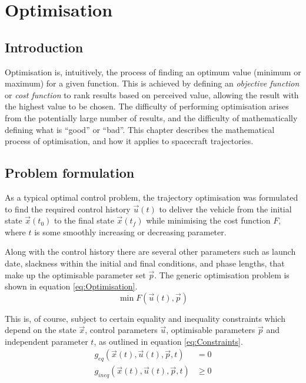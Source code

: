 \chapter{Optimisation} \label{cha:Optimisation}
\section{Introduction} \label{sec:Optimisation-Introduction}

Optimisation is, intuitively, the process of finding an optimum value (minimum or maximum) for a given function. This is achieved by defining an \emph{objective function} or \emph{cost function} to rank results based on perceived value, allowing the result with the highest value to be chosen. The difficulty of performing optimisation arises from the potentially large number of results, and the difficulty of mathematically defining what is \enquote{good} or \enquote{bad}. This chapter describes the mathematical process of optimisation, and how it applies to spacecraft trajectories.

\section{Problem formulation} \label{sec:Formulation}

As a typical optimal control problem, the trajectory optimisation was formulated to find the required control history $\vec{u}(t)$ to deliver the vehicle from the initial state $\vec{x}(t_0)$ to the final state $\vec{x}(t_f)$ while minimising the cost function $F$, where $t$ is some smoothly increasing or decreasing parameter. 

Along with the control history there are several other parameters such as launch date, slackness within the initial and final conditions, and phase lengths, that make up the optimisable parameter set $\vec{p}$. The generic optimisation problem is shown in equation \eqref{eq:Optimisation}.
\begin{equation} \label{eq:Optimisation}
\min F(\vec{u}(t),\vec{p})
\end{equation}

This is, of course, subject to certain equality and inequality constraints which depend on the state $\vec{x}$, control parameters $\vec{u}$, optimisable parameters $\vec{p}$ and independent parameter $t$, as outlined in equation \eqref{eq:Constraints}.
\begin{subequations} \label{eq:Constraints}
\begin{align}
g_{eq}(\vec{x}(t),\vec{u}(t),\vec{p},t) &= 0 \\
g_{ineq}(\vec{x}(t),\vec{u}(t),\vec{p},t) &\ge 0 
\end{align}
\end{subequations}

